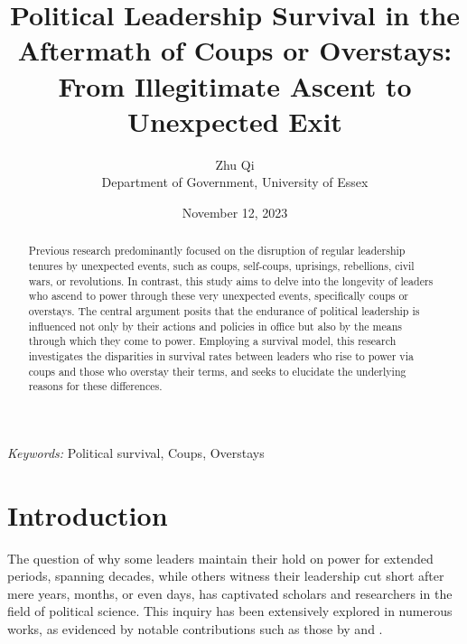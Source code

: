\documentclass[
  12pt,
  a4paper,
  12pt]{article}
\begin{document}
\def\spacingset#1{\renewcommand{\baselinestretch}%
{#1}\small\normalsize} \spacingset{1}



\date{November 12, 2023}
\title{\bf Political Leadership Survival in the Aftermath of Coups or
Overstays: From Illegitimate Ascent to Unexpected Exit}
\author{
Zhu Qi\\
Department of Government, University of Essex\\
}
\maketitle

\bigskip
\bigskip
\begin{abstract}
Previous research predominantly focused on the disruption of regular
leadership tenures by unexpected events, such as coups, self-coups,
uprisings, rebellions, civil wars, or revolutions. In contrast, this
study aims to delve into the longevity of leaders who ascend to power
through these very unexpected events, specifically coups or overstays.
The central argument posits that the endurance of political leadership
is influenced not only by their actions and policies in office but also
by the means through which they come to power. Employing a survival
model, this research investigates the disparities in survival rates
between leaders who rise to power via coups and those who overstay their
terms, and seeks to elucidate the underlying reasons for these
differences.
\end{abstract}

\noindent%
{\it Keywords:} Political survival, Coups, Overstays
\vfill

\newpage
\spacingset{1.9} %
\ifdefined\Shaded\renewenvironment{Shaded}{\begin{tcolorbox}[interior hidden, borderline west={3pt}{0pt}{shadecolor}, sharp corners, breakable, enhanced, frame hidden, boxrule=0pt]}{\end{tcolorbox}}\fi

\hypertarget{introduction}{%
\section{Introduction}\label{introduction}}

The question of why some leaders maintain their hold on power for
extended periods, spanning decades, while others witness their
leadership cut short after mere years, months, or even days, has
captivated scholars and researchers in the field of political science.
This inquiry has been extensively explored in numerous works, as
evidenced by notable contributions such as those by
\citet{clinton1975politics} and \citet{buenodemesquita2003}.
\end{document}
